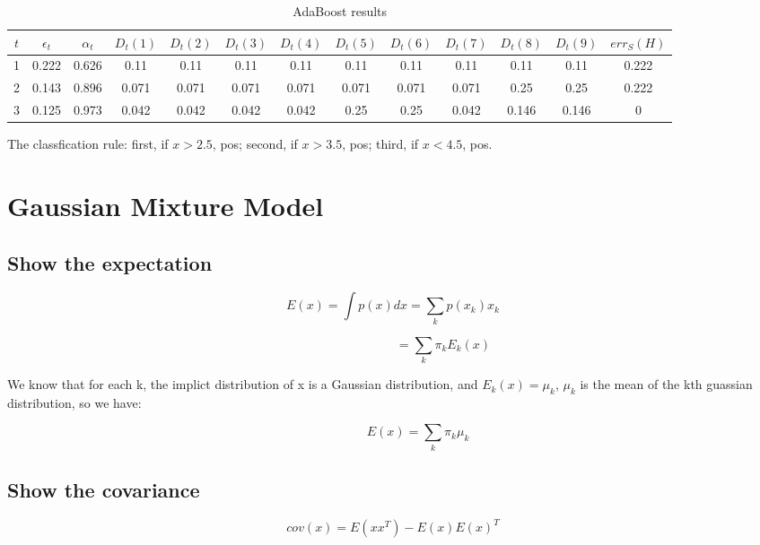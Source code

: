 \documentclass{article} %
\begin{document}
\begin{table}[h]
\renewcommand{\arraystretch}{1.5}
\centering
\begin{tabular}{|c|c|c|c|c|c|c|c|c|c|c|c|c|}
\hline 
$ t $ 
& $ \epsilon_t $ 
& $ \alpha_t $ 
& $ D_t(1) $ 
& $ D_t(2) $ 
& $ D_t(3) $
& $ D_t(4) $
& $ D_t(5) $
& $ D_t(6) $
& $ D_t(7) $
& $ D_t(8) $
& $ D_t(9) $ 
& $ err_S(H) $ \\
\hline 
1 &0.222 &0.626 &0.11 &0.11 &0.11 &0.11 &0.11
&0.11 &0.11 &0.11 &0.11 &0.222 \\
\hline 
2 &0.143 &0.896 &0.071 &0.071 &0.071 &0.071 &0.071
&0.071 &0.071 &0.25 &0.25 &0.222 \\
\hline 
3 &0.125 &0.973 &0.042 &0.042 &0.042 &0.042 &0.25
&0.25 &0.042 &0.146 &0.146 &0 \\
\hline 
\end{tabular}
\caption{AdaBoost results}
\label{tbl:boost}
\end{table}

The classfication rule: first, if $x > 2.5$, pos; second, if $x > 3.5$,
pos; third, if $x < 4.5$, pos.



\section{Gaussian Mixture Model}


\subsection{Show the expectation}
\begin{equation}
E (x) = \int p(x) dx = \sum_k p(x_k) x_k
\end{equation}

\begin{equation}
\qquad \qquad \qquad \qquad
= \sum_k \pi_k E_k (x)
\end{equation}

We know that for each k, the implict distribution of x is a Gaussian
distribution, and $E_k (x) = \mu_k$, $\mu_k$ is the mean of the kth guassian
distribution, so we have:

\begin{equation}
\qquad \qquad
E (x) = \sum_k \pi_k \mu_k
\end{equation}


\subsection{Show the covariance}
\begin{equation}
cov (x) = E (x x^T) - E (x) E(x)^T
\end{equation}
\end{document}
